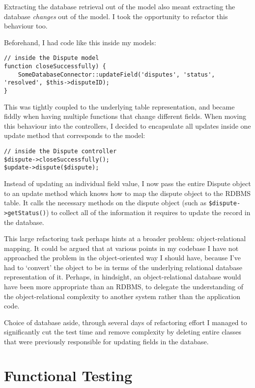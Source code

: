 Extracting the database retrieval out of the model also meant extracting the database \emph{changes} out of the model. I took the opportunity to refactor this behaviour too.

Beforehand, I had code like this inside my models:

\begin{lstlisting}
// inside the Dispute model
function closeSuccessfully) {
    SomeDatabaseConnector::updateField('disputes', 'status', 'resolved', $this->disputeID);
}
\end{lstlisting}

This was tightly coupled to the underlying table representation, and became fiddly when having multiple functions that change different fields. When moving this behaviour into the controllers, I decided to encapsulate all updates inside one update method that corresponds to the model:

\begin{lstlisting}
// inside the Dispute controller
$dispute->closeSuccessfully();
$update->dispute($dispute);
\end{lstlisting}

Instead of updating an individual field value, I now pass the entire Dispute object to an update method which knows how to map the dispute object to the RDBMS table. It calls the necessary methods on the dispute object (such as \lstinline{$dispute->getStatus()}) to collect all of the information it requires to update the record in the database. 

This large refactoring task perhaps hints at a broader problem: object-relational mapping. It could be argued that at various points in my codebase I have not approached the problem in the object-oriented way I should have, because I've had to `convert' the object to be in terms of the underlying relational database representation of it. Perhaps, in hindsight, an object-relational database would have been more appropriate than an RDBMS, to delegate the understanding of the object-relational complexity to another system rather than the application code.

Choice of database aside, through several days of refactoring effort I managed to significantly cut the test time and remove complexity by deleting entire classes that were previously responsible for updating fields in the database.

\section{Functional Testing}

